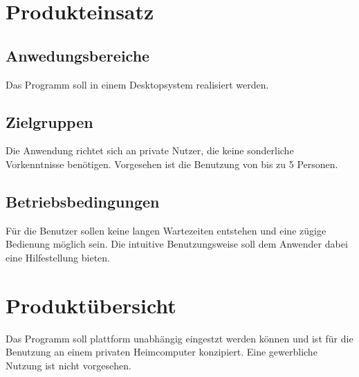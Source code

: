 \documentclass[a4paper]{article}
\begin{document}
  \section{Produkteinsatz}

    \subsection{Anwedungsbereiche}
			Das Programm soll in einem Desktopsystem realisiert werden.

    \subsection{Zielgruppen}
			Die Anwendung richtet sich an private Nutzer, die keine sonderliche Vorkenntnisse benötigen. Vorgesehen ist die Benutzung von bis zu 5 Personen.

    \subsection{Betriebsbedingungen}
      Für die Benutzer sollen keine langen Wartezeiten entstehen und eine zügige Bedienung möglich sein. Die intuitive Benutzungsweise soll dem Anwender dabei eine Hilfestellung bieten.

  \section{Produktübersicht}
		Das Programm soll plattform unabhängig eingestzt werden können und ist für die Benutzung an einem privaten Heimcomputer konzipiert. Eine gewerbliche Nutzung ist nicht vorgesehen.
\end{document}
